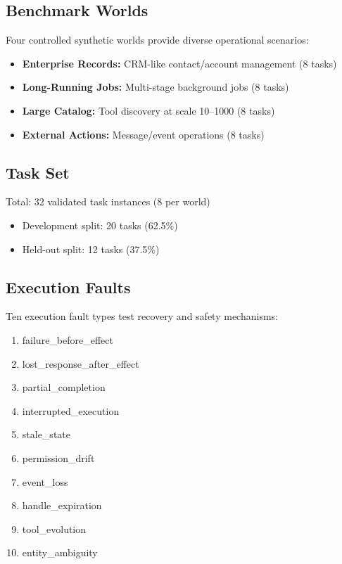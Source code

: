 \subsection{Benchmark Worlds}
Four controlled synthetic worlds provide diverse operational scenarios:

\begin{itemize}
    \item \textbf{Enterprise Records:} CRM-like contact/account management (8 tasks)
    \item \textbf{Long-Running Jobs:} Multi-stage background jobs (8 tasks)
    \item \textbf{Large Catalog:} Tool discovery at scale 10--1000 (8 tasks)
    \item \textbf{External Actions:} Message/event operations (8 tasks)
\end{itemize}

\subsection{Task Set}
Total: 32 validated task instances (8 per world)
\begin{itemize}
    \item Development split: 20 tasks (62.5\%)
    \item Held-out split: 12 tasks (37.5\%)
\end{itemize}

\subsection{Execution Faults}
Ten execution fault types test recovery and safety mechanisms:
\begin{enumerate}
    \item failure\_before\_effect
    \item lost\_response\_after\_effect
    \item partial\_completion
    \item interrupted\_execution
    \item stale\_state
    \item permission\_drift
    \item event\_loss
    \item handle\_expiration
    \item tool\_evolution
    \item entity\_ambiguity
\end{enumerate}

